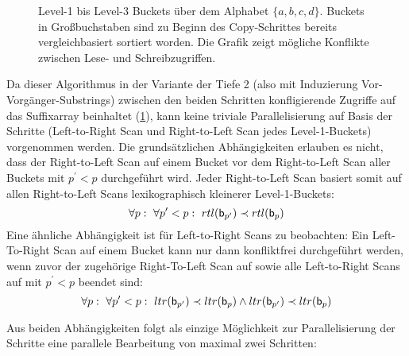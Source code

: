{\begin{landscape}
\begin{figure}[p]
{
            }
            \caption[Parallelisierbarkeit der Copy-Technik]{Level-1 bis Level-3 Buckets über dem Alphabet \(\{a, b, c, d\}\).
            Buckets in Großbuchstaben sind zu Beginn des Copy-Schrittes bereits vergleichbasiert sortiert worden.
            Die Grafik zeigt mögliche Konflikte zwischen Lese- und Schreibzugriffen.}
            \label{fig:seward:parallel}
        \end{figure}
    \end{landscape}
}
Da dieser Algorithmus in der Variante der Tiefe 2 (also mit Induzierung Vor-Vorgänger-Substrings) zwischen den beiden Schritten konfligierende Zugriffe auf das Suffixarray beinhaltet (\cref{fig:seward:parallel}), kann keine triviale Parallelisierung auf Basis der Schritte (Left-to-Right Scan und Right-to-Left Scan jedes Level-1-Buckets) vorgenommen werden.
Die grundsätzlichen Abhängigkeiten erlauben es nicht, dass der Right-to-Left Scan  auf einem Bucket  vor dem Right-to-Left Scan aller Buckets  mit \(p^\prime < p\) durchgeführt wird.
Jeder Right-to-Left Scan basiert somit auf allen Right-to-Left Scans lexikographisch kleinerer Level-1-Buckets:
\[\forall p:~\forall p^\prime < p:~rtl(\mathsf{b}_{p^\prime}) \prec rtl(\mathsf{b}_{p})\]
Eine ähnliche Abhängigkeit ist für Left-to-Right Scans zu beobachten: Ein Left-To-Right Scan  auf einem Bucket  kann nur dann konfliktfrei durchgeführt werden, wenn zuvor der zugehörige Right-To-Left Scan auf  sowie alle Left-to-Right Scans auf  mit \(p^\prime < p\) beendet sind:
\[\forall p:~\forall p^\prime < p:~ltr(\mathsf{b}_{p^\prime}) \prec ltr(\mathsf{b}_{p}) \wedge ltr(\mathsf{b}_{p^\prime}) \prec ltr(\mathsf{b}_{p})\]\par
Aus beiden Abhängigkeiten folgt als einzige Möglichkeit zur Parallelisierung der Schritte eine parallele Bearbeitung von maximal zwei Schritten:
